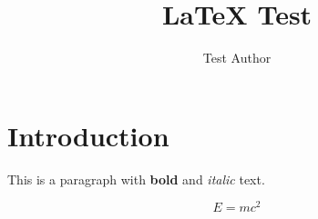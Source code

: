 \documentclass{article}
\begin{document}
\title{LaTeX Test}
\author{Test Author}
\maketitle

\section{Introduction}

This is a paragraph with \textbf{bold} and \textit{italic} text.


\begin{equation}
E = mc^2
\end{equation}
\end{document}
